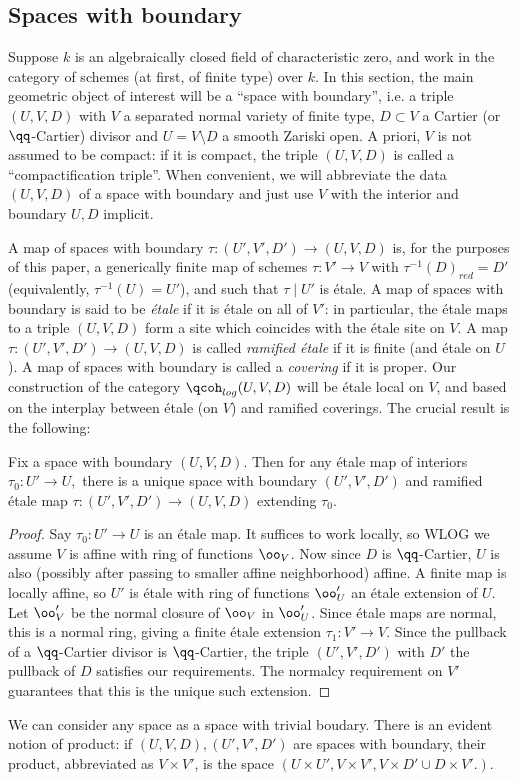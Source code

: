 \documentclass{article}
\begin{document}
\subsection{Spaces with boundary}
Suppose $k$ is an algebraically closed field of characteristic zero, and work in the category of schemes (at first, of finite type) over $k$. In this section, the main geometric object of interest will be a ``space with boundary'', i.e. a triple $(U, V, D)$ with $V$ a separated normal variety of finite type, $D\subset V$ a Cartier (or $\qq$-Cartier) divisor and $U = V\setminus D$ a smooth Zariski open. A priori, $V$ is not assumed to be compact: if it is compact, the triple $(U, V, D)$ is called a ``compactification triple''. When convenient, we will abbreviate the data $(U, V, D)$ of a space with boundary and just use $V$ with the interior and boundary $U, D$ implicit.

A map of spaces with boundary $\tau:(U', V', D')\to (U, V, D)$ is, for the purposes of this paper, a generically finite map of schemes $\tau:V'\to V$ with $\tau^{-1}(D)_{red} = D'$ (equivalently, $\tau^{-1}(U) = U'$), and such that $\tau\mid U'$ is \'etale. A map of spaces with boundary is said to be \emph{\'etale} if it is \'etale on all of $V'$: in particular, the \'etale maps to a triple $(U, V, D)$ form a site which coincides with the \'etale site on $V$. A map $\tau:(U', V', D')\to (U, V, D)$ is called \emph{ramified \'etale} if it is finite (and \'etale on $U$). A map of spaces with boundary is called a \emph{covering} if it is proper. Our construction of the category $\qcoh_{log}(U, V, D)$ will be \'etale local on $V$, and based on the interplay between \'etale (on $V$) and ramified coverings. The crucial result is the following:
\begin{lm}\label{lm:finite-extension}
  Fix a space with boundary $(U, V, D).$ Then for any \'etale map of interiors $\tau_0:U'\to U,$ there is a unique space with boundary $(U', V', D')$ and ramified \'etale map $\tau: (U', V', D')\to (U, V, D)$ extending $\tau_0.$ 
\end{lm}
\begin{proof}
  Say $\tau_0:U'\to U$ is an \'etale map. It suffices to work locally, so WLOG we assume $V$ is affine with ring of functions $\oo_V$. Now since $D$ is $\qq$-Cartier, $U$ is also (possibly after passing to smaller affine neighborhood) affine. A finite map is locally affine, so $U'$ is \'etale with ring of functions $\oo_U'$ an \'etale extension of $U$. Let $\oo_V'$ be the normal closure of $\oo_V$ in $\oo_U'$. Since \'etale maps are normal, this is a normal ring, giving a finite \'etale extension $\tau_1:V'\to V$. Since the pullback of a $\qq$-Cartier divisor is $\qq$-Cartier, the triple $(U', V', D')$ with $D'$ the pullback of $D$ satisfies our requirements. The normalcy requirement on $V'$ guarantees that this is the unique such extension.
\end{proof}
We can consider any space as a space with trivial boudary. There is an evident notion of product: if $(U, V, D), (U', V', D')$ are spaces with boundary, their product, abbreviated as $V\times V'$, is the space $(U\times U', V\times V', V\times D'\cup D\times V'.)$.
\end{document}
